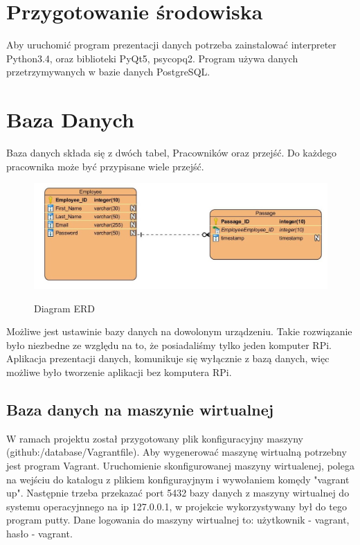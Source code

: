 \section{Przygotowanie środowiska}
Aby uruchomić program prezentacji danych potrzeba zainstalować interpreter Python3.4, oraz biblioteki PyQt5, psycopq2. Program używa danych przetrzymywanych w bazie danych PostgreSQL.
\section{Baza Danych}
Baza danych składa się z dwóch tabel, Pracowników oraz przejść. Do każdego pracownika może być przypisane wiele przejść.

\begin{figure}[h!]
	\centering
	\includegraphics[width=\linewidth]{img/ERD_screen.jpg}
	\label{fig:ERD}
	\caption[Diagram ERD]{Diagram ERD}
\end{figure}
Możliwe jest ustawinie bazy danych na dowolonym urządzeniu. Takie rozwiązanie było niezbedne ze względu na to, że posiadaliśmy tylko jeden komputer RPi. Aplikacja prezentacji danych, komunikuje się wyłącznie z bazą danych, więc możliwe było tworzenie aplikacji bez komputera RPi.
\subsection{Baza danych na maszynie wirtualnej}
W ramach projektu został przygotowany plik konfiguracyjny maszyny\\ (github:/database/Vagrantfile). Aby wygenerować maszynę wirtualną potrzebny jest program Vagrant. Uruchomienie skonfigurowanej maszyny wirtualenej, polega na wejściu do katalogu z plikiem konfigurayjnym i wywołaniem komędy "vagrant up". Następnie trzeba przekazać port 5432 bazy danych z maszyny wirtualnej do systemu operacyjnnego na ip 127.0.0.1, w projekcie wykorzystywany był do tego program putty.
Dane logowania do maszyny wirtualnej to: użytkownik - vagrant, hasło - vagrant.

